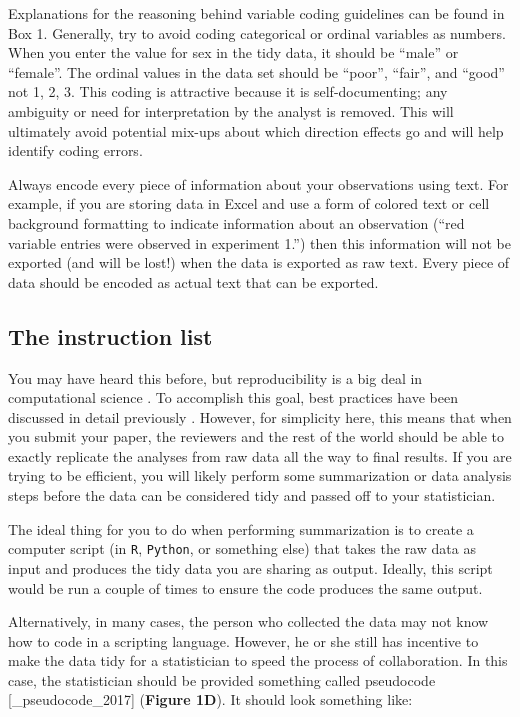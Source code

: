 \documentclass[12pt]{article}
\begin{document}
Explanations for the reasoning behind variable coding guidelines can be
found in Box 1. Generally, try to avoid coding categorical or ordinal
variables as numbers. When you enter the value for sex in the tidy data,
it should be ``male'' or ``female''. The ordinal values in the data set
should be ``poor'', ``fair'', and ``good'' not 1, 2, 3. This coding is
attractive because it is self-documenting; any ambiguity or need for
interpretation by the analyst is removed. This will ultimately avoid
potential mix-ups about which direction effects go and will help
identify coding errors.

Always encode every piece of information about your observations using
text. For example, if you are storing data in Excel and use a form of
colored text or cell background formatting to indicate information about
an observation (``red variable entries were observed in experiment 1.'')
then this information will not be exported (and will be lost!) when the
data is exported as raw text. Every piece of data should be encoded as
actual text that can be exported.

\subsection{The instruction list}
\label{sec:instruction}

You may have heard this before, but reproducibility is a big deal in
computational science \citep{peng_reproducible_2011}. To accomplish this
goal, best practices have been discussed in detail previously
\citep{wilson_good_2016}. However, for simplicity here, this means that
when you submit your paper, the reviewers and the rest of the world
should be able to exactly replicate the analyses from raw data all the
way to final results. If you are trying to be efficient, you will likely
perform some summarization or data analysis steps before the data can be
considered tidy and passed off to your statistician.

The ideal thing for you to do when performing summarization is to create
a computer script (in \texttt{R}, \texttt{Python}, or something else)
that takes the raw data as input and produces the tidy data you are
sharing as output. Ideally, this script would be run a couple of times
to ensure the code produces the same output.

Alternatively, in many cases, the person who collected the data may not
know how to code in a scripting language. However, he or she still has
incentive to make the data tidy for a statistician to speed the process
of collaboration. In this case, the statistician should be provided
something called pseudocode {[}\_pseudocode\_2017{]} (\textbf{Figure
1D}). It should look something like:
\end{document}
